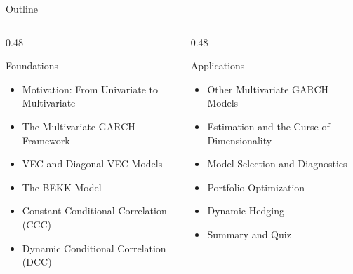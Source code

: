 \documentclass[9pt, aspectratio=169, t]{beamer}
\begin{document}
\begin{frame}{Outline}
    \vspace{-0.3cm}
    {\small
    \begin{columns}[T]
        \begin{column}{0.48\textwidth}
            \begin{block}{Foundations}
                \begin{itemize}\setlength{\itemsep}{3pt}
                    \item Motivation: From Univariate to Multivariate
                    \item The Multivariate GARCH Framework
                    \item VEC and Diagonal VEC Models
                    \item The BEKK Model
                    \item Constant Conditional Correlation (CCC)
                    \item Dynamic Conditional Correlation (DCC)
                \end{itemize}
            \end{block}
        \end{column}
        \begin{column}{0.48\textwidth}
            \begin{exampleblock}{Applications}
                \begin{itemize}\setlength{\itemsep}{3pt}
                    \item Other Multivariate GARCH Models
                    \item Estimation and the Curse of Dimensionality
                    \item Model Selection and Diagnostics
                    \item Portfolio Optimization
                    \item Dynamic Hedging
                    \item Summary and Quiz
                \end{itemize}
            \end{exampleblock}
        \end{column}
    \end{columns}
    }
\end{frame}
\end{document}
